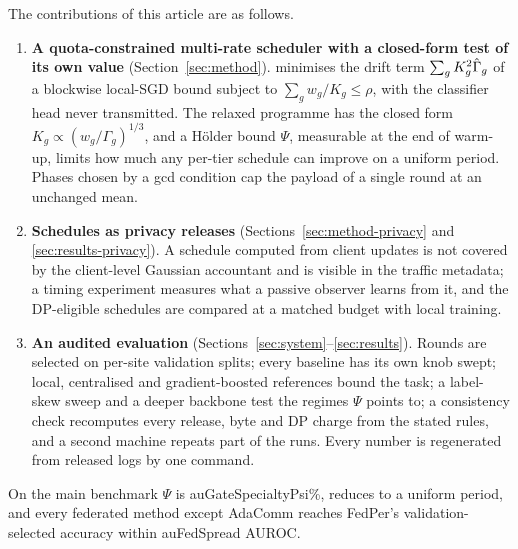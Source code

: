 The contributions of this article are as follows.
\begin{enumerate}
\item \textbf{A quota-constrained multi-rate scheduler with a closed-form test of its own value} (Section~\ref{sec:method}). \tierfed{} minimises the drift term $\sum_g K_g^2\hat\Gamma_g$ of a blockwise local-SGD bound subject to $\sum_g w_g/K_g\le\rho$, with the classifier head never transmitted. The relaxed programme has the closed form $K_g\propto(w_g/\Gamma_g)^{1/3}$, and a H\"older bound $\Psi$, measurable at the end of warm-up, limits how much any per-tier schedule can improve on a uniform period. Phases chosen by a gcd condition cap the payload of a single round at an unchanged mean.
\item \textbf{Schedules as privacy releases} (Sections~\ref{sec:method-privacy} and \ref{sec:results-privacy}). A schedule computed from client updates is not covered by the client-level Gaussian accountant and is visible in the traffic metadata; a timing experiment measures what a passive observer learns from it, and the DP-eligible schedules are compared at a matched budget with local training.
\item \textbf{An audited evaluation} (Sections~\ref{sec:system}--\ref{sec:results}). Rounds are selected on per-site validation splits; every baseline has its own knob swept; local, centralised and gradient-boosted references bound the task; a label-skew sweep and a deeper backbone test the regimes $\Psi$ points to; a consistency check recomputes every release, byte and DP charge from the stated rules, and a second machine repeats part of the runs. Every number is regenerated from released logs by one command.
\end{enumerate}
On the main benchmark $\Psi$ is \num{auGateSpecialtyPsi}\%, \tierfed{} reduces to a uniform period, and every federated method except AdaComm reaches FedPer's validation-selected accuracy within \num{auFedSpread} AUROC.
